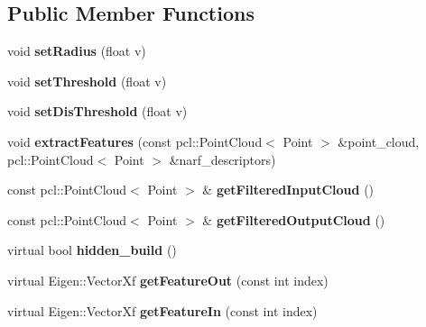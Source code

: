 \subsection*{Public Member Functions}
\begin{DoxyCompactItemize}
\item 
\hypertarget{classFeature__Edges_a41ec56a73dd43ead9c9fe21e7b13dee9}{
void {\bfseries setRadius} (float v)}
\label{classFeature__Edges_a41ec56a73dd43ead9c9fe21e7b13dee9}

\item 
\hypertarget{classFeature__Edges_aa0de4ecd75699f5bf22de8b66b8dcf8f}{
void {\bfseries setThreshold} (float v)}
\label{classFeature__Edges_aa0de4ecd75699f5bf22de8b66b8dcf8f}

\item 
\hypertarget{classFeature__Edges_ab5c0a1152e42c338f0aace02e5e9ed5e}{
void {\bfseries setDisThreshold} (float v)}
\label{classFeature__Edges_ab5c0a1152e42c338f0aace02e5e9ed5e}

\item 
\hypertarget{classFeature__Edges_a81bfa5b7b55f323ee7083aa77b1061a8}{
void {\bfseries extractFeatures} (const pcl::PointCloud$<$ Point $>$ \&point\_\-cloud, pcl::PointCloud$<$ Point $>$ \&narf\_\-descriptors)}
\label{classFeature__Edges_a81bfa5b7b55f323ee7083aa77b1061a8}

\item 
\hypertarget{classFeature__Edges_a9c58dc3da80bde5f40b3c258298c4c3d}{
const pcl::PointCloud$<$ Point $>$ \& {\bfseries getFilteredInputCloud} ()}
\label{classFeature__Edges_a9c58dc3da80bde5f40b3c258298c4c3d}

\item 
\hypertarget{classFeature__Edges_a795dd24e9882c53f3a83ab5bf61d1016}{
const pcl::PointCloud$<$ Point $>$ \& {\bfseries getFilteredOutputCloud} ()}
\label{classFeature__Edges_a795dd24e9882c53f3a83ab5bf61d1016}

\item 
\hypertarget{classFeature__Edges_a10dea841a445f57a5441ecf294b02da7}{
virtual bool {\bfseries hidden\_\-build} ()}
\label{classFeature__Edges_a10dea841a445f57a5441ecf294b02da7}

\item 
\hypertarget{classFeature__Edges_aad4c7a631f08d6a703b52c3d4cafbcf6}{
virtual Eigen::VectorXf {\bfseries getFeatureOut} (const int index)}
\label{classFeature__Edges_aad4c7a631f08d6a703b52c3d4cafbcf6}

\item 
\hypertarget{classFeature__Edges_aeb41e8219b109d0bef79ff9f3206d036}{
virtual Eigen::VectorXf {\bfseries getFeatureIn} (const int index)}
\label{classFeature__Edges_aeb41e8219b109d0bef79ff9f3206d036}

\end{DoxyCompactItemize}
